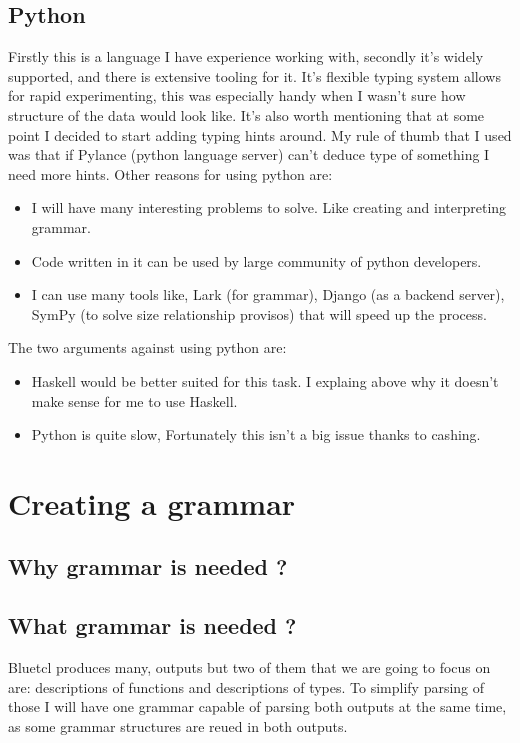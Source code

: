 \documentclass[14pt]{report}
\begin{document}
\subsection{Python}
Firstly this is a language I have experience working with, secondly it's widely supported, and there is extensive tooling for it. It's flexible typing system allows for rapid experimenting, this was especially handy when I wasn't sure how structure of the data would look like. It's also worth mentioning that at some point I decided to start adding typing hints around. My rule of thumb that I used was that if Pylance (python language server) can't deduce type of something I need more hints.
Other reasons for using python are:
\begin{itemize}
    \item I will have many interesting problems to solve. Like creating and interpreting grammar.
    \item Code written in it can be used by large community of python developers.
    \item I can use many tools like, Lark (for grammar), Django (as a backend server), SymPy (to solve size relationship provisos) that will speed up the process.
\end{itemize}
The two arguments against using python are:
\begin{itemize}
    \item Haskell would be better suited for this task. I explaing above why it doesn't make sense for me to use Haskell. 
    \item Python is quite slow, Fortunately this isn't a big issue thanks to cashing.
\end{itemize}
\section{Creating a grammar}

\subsection{Why grammar is needed ?}


\subsection{What grammar is needed ?}
Bluetcl produces many, outputs but two of them that we are going to focus on are: descriptions of functions and descriptions of types. To simplify parsing of those I will have one grammar capable of parsing both outputs at the same time, as some grammar structures are reued in both outputs.
\end{document}
